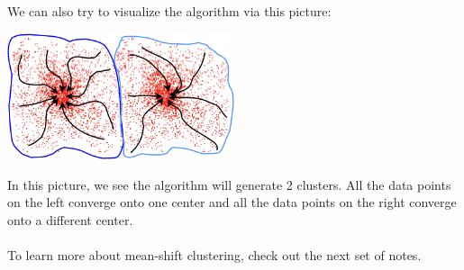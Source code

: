 \documentclass{article}
\begin{document}
We can also try to visualize the algorithm via this picture:
\begin{center}
\centering
\includegraphics[width=0.5\textwidth]{mean-shift.png}
\end{center}
In this picture, we see the algorithm will generate 2 clusters. All the data points on the left converge onto one center and all the data points on the right converge onto a different center.
\\~\\
To learn more about mean-shift clustering, check out the next set of notes.

\small


\end{document}
